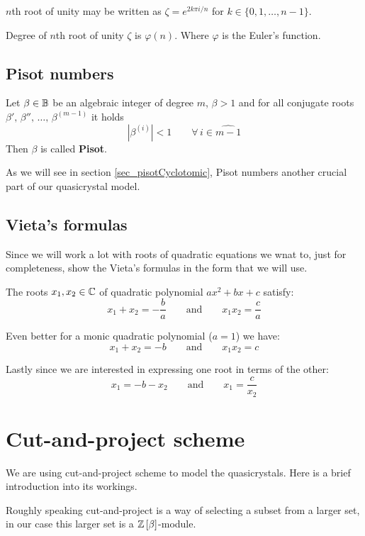 \documentclass[text.tex]{subfiles}
\begin{document}
\begin{remark}
$n$th root of unity may be written as $\zeta = e^{2k\pi i/n}$ for $k\in \{0, 1, \dots, n-1\}$.
\end{remark}

\begin{theorem}
Degree of $n$th root of unity $\zeta$ is $\varphi(n)$. Where $\varphi$ is the Euler's function.
\end{theorem}

\subsection{Pisot numbers}
\begin{definition}
Let $\beta\in\mathbb{B}$ be an algebraic integer of degree $m$, $\beta>1$  and for all conjugate roots $\beta',\,\beta'',\,\dots ,\,\beta^{(m-1)}$ it holds
$$|\beta^{(i)}|<1\qquad \forall\, i\in\widehat{m-1}$$
Then $\beta$ is called \textbf{Pisot}.
\end{definition}

As we will see in section \ref{sec_pisotCyclotomic}, Pisot numbers another crucial part of our quasicrystal model. 

\subsection{Vieta's formulas}
Since we will work a lot with roots of quadratic equations we wnat to, just for completeness, show the Vieta's formulas in the form that we will use. 

The roots $x_1,x_2\in\mathbb{C}$ of quadratic polynomial $ax^2+bx+c$ satisfy: 
$$x_1+x_2=-\frac{b}{a}\qquad\text{and}\qquad x_1x_2=\frac{c}{a}$$

Even better for a monic quadratic polynomial ($a=1$) we have:
$$x_1+x_2=-b\qquad\text{and}\qquad x_1x_2=c$$

Lastly since we are interested in expressing one root in terms of the other: 
$$x_1=-b-x_2\qquad\text{and}\qquad x_1=\frac{c}{x_2}$$

\section{Cut-and-project scheme}\label{sec_cutAndProject}%
We are using cut-and-project scheme to model the quasicrystals. Here is a brief introduction into its workings. 

Roughly speaking cut-and-project is a way of selecting a subset from a larger set, in our case this larger set is a $\mathbb{Z}\left[\beta\right]$-module. 
\end{document}
